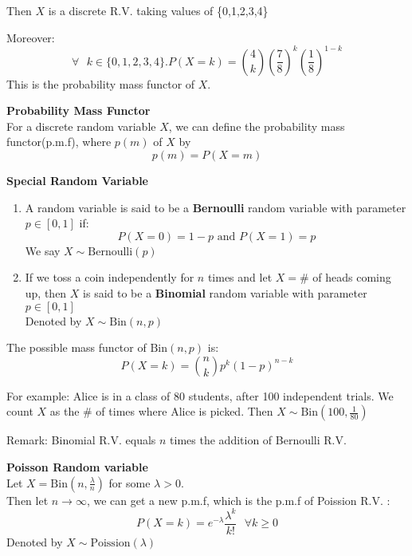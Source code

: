 \documentclass{article}
\begin{document}
Then $X$ is a discrete R.V. taking values of \{0,1,2,3,4\}

Moreover:
$$\forall \text{ } k \in \{0,1,2,3,4\}. P(X=k) = \binom{4}{k}(\frac{7}{8})^k(\frac{1}{8})^{1-k}$$
This is the probability mass functor of $X$.
\begin{definition}
    \textbf{Probability Mass Functor}\\
    For a discrete random variable $X$, we can define the probability mass functor(p.m.f), where $p(m)$ of $X$ by
    $$ p(m) = P(X=m)$$
\end{definition}

\begin{definition}
    
    \textbf{Special Random Variable}
    \begin{enumerate}
        \item A random variable is said to be a \textbf{Bernoulli} random variable with parameter $p \in [0,1]$ if: 
        $$ P(X=0) = 1 - p \text{ and } P(X = 1) = p $$
        We say $ X \sim \text{Bernoulli}(p)$
        \item If we toss a coin independently for $n$ times and let $X = \#$ of heads coming up, then $X$ is said to be a \textbf{Binomial} random variable with parameter $p \in [0,1]$\\
        Denoted by $X \sim \text{Bin}(n,p)$
    \end{enumerate}
    
\end{definition}
The possible mass functor of $\text{Bin}(n,p)$ is:
$$ P(X=k) = \binom{n}{k}p^k(1-p)^{n-k}$$

For example: Alice is in a class of 80 students, after 100 independent trials. We count $X$ as the \# of times where Alice is picked. Then $X \sim \text{Bin}(100, \frac{1}{80})$


Remark: Binomial R.V. equals $n$ times the addition of Bernoulli R.V.


\begin{definition}
    \textbf{Poisson Random variable}\\
    Let $X = \text{Bin}(n,\frac{\lambda}{n})$ for some $\lambda > 0$.\\
    Then let $n \rightarrow \infty$, we can get a new p.m.f, which is the p.m.f of Poission R.V. :
    $$ P(X = k) = e^{-\lambda}\frac{\lambda^k}{k!} \textbf{ } \forall k \geq 0$$
    Denoted by $ X \sim \text{Poission}(\lambda)$
\end{definition}
\end{document}
